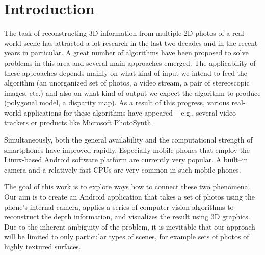 \chapter*{Introduction}


The task of reconstructing 3D information from multiple 2D photos of a real-world scene has attracted a lot research in the last two decades and in the recent years in particular.
A great number of algorithms have been proposed to solve problems in this area and several main approaches emerged. 
The applicability of these approaches depends mainly on what kind of input we intend to feed the algorithm 
(an unorganized set of photos, a video stream, a pair of stereoscopic images, etc.) 
and also on what kind of output we expect the algorithm to produce (polygonal model, a disparity map). 
As a result of this progress, various real-world applications for these algorithms have appeared -- 
e.g., several video trackers or products like Microsoft PhotoSynth.

Simultaneously, both the general availability and the computational strength of smartphones have improved rapidly.
Especially mobile phones that employ the Linux-based Android software platform are currently very popular. 
A built–in camera and a relatively fast CPUs are very common in such mobile phones.

The goal of this work is to explore ways how to connect these two phenomena. 
Our aim is to create an Android application that takes a set of photos using the phone's internal camera, applies a series of computer vision algorithms to reconstruct the depth information, and visualizes the result using 3D graphics. 
Due to the inherent ambiguity of the problem, it is inevitable that our approach will be limited to only particular types of scenes, for example sets of photos of highly textured surfaces. 

